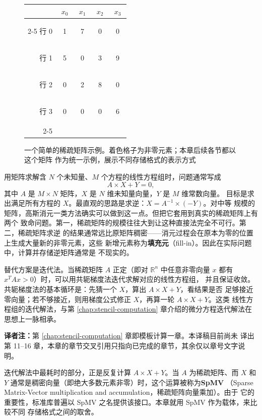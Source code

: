 \begin{figure}[htbp]
  \centering
  \small
  \begin{tabular}{r|cccc|}
    \multicolumn{1}{c}{} & \multicolumn{1}{c}{$x_0$} & \multicolumn{1}{c}{$x_1$}
      & \multicolumn{1}{c}{$x_2$} & \multicolumn{1}{c}{$x_3$}\\
    \cline{2-5}
    行 0 & \colorbox{blue!22}{\strut\ 1\ } & \colorbox{blue!22}{\strut\ 7\ } & \strut\ 0\ & \strut\ 0\ \\
    行 1 & \colorbox{blue!22}{\strut\ 5\ } & \strut\ 0\ & \colorbox{blue!22}{\strut\ 3\ } & \colorbox{blue!22}{\strut\ 9\ }\\
    行 2 & \strut\ 0\ & \colorbox{blue!22}{\strut\ 2\ } & \colorbox{blue!22}{\strut\ 8\ } & \strut\ 0\ \\
    行 3 & \strut\ 0\ & \strut\ 0\ & \strut\ 0\ & \colorbox{blue!22}{\strut\ 6\ }\\
    \cline{2-5}
  \end{tabular}
  \caption{一个简单的稀疏矩阵示例。着色格子为非零元素；本章后续各节都以这个矩阵
  作为统一示例，展示不同存储格式的表示方式}
  \label{fig:17-1}
\end{figure}

用矩阵求解含 $N$ 个未知量、$M$ 个方程的线性方程组时，问题通常写成
\[
  A\times X + Y = 0,
\]
其中 $A$ 是 $M\times N$ 矩阵，$X$ 是 $N$ 维未知量向量，$Y$ 是 $M$ 维常数向量。
目标是求出满足所有方程的 $X$。最直观的思路是求逆：$X = A^{-1}\times(-Y)$。对中等
规模的矩阵，高斯消元一类方法确实可以做到这一点。但把它套用到真实的稀疏矩阵上有两个
致命问题。第一，稀疏矩阵的规模往往大到让这种直接法完全不可行。第二，稀疏矩阵求逆
的结果通常远比原矩阵稠密——消元过程会在原本为零的位置上生成大量新的非零元素，这些
新增元素称为\textbf{填充元}（fill-in）。因此在实际问题中，计算并存储逆矩阵通常是
不现实的。

替代方案是迭代法。当稀疏矩阵 $A$ 正定（即对 $\mathbb{R}^n$ 中任意非零向量 $x$ 都有
$x^{T}Ax>0$）时，可以用共轭梯度法\cite{hestenes1952cg}迭代求解对应的线性方程组，
并且保证收敛。共轭梯度法的基本循环是：先猜一个 $X$，算出 $A\times X + Y$，看结果是否
足够接近零向量；若不够接近，则用梯度公式修正 $X$，再算一轮 $A\times X + Y$。这类
线性方程组的迭代解法，与第 \ref{chap:stencil-computation} 章介绍的微分方程迭代解法在思想上一脉相承。

\noindent\textbf{译者注：}第 \ref{chap:stencil-computation} 章即模板计算一章。本译稿目前尚未
译出第 11--16 章，本章的章节交叉引用只指向已完成的章节，其余仅以章号文字说明。

迭代解法中最耗时的部分，正是反复计算 $A\times X + Y$。当 $A$ 为稀疏矩阵、而 $X$ 和
$Y$ 通常是稠密向量（即绝大多数元素非零）时，这个运算被称为\textbf{SpMV}
（Sparse Matrix-Vector multiplication and accumulation，稀疏矩阵向量乘加）。由于
它的重要性，标准库普遍以 SpMV 之名提供该接口。本章就用 SpMV 作为载体，来比较不同
存储格式之间的取舍。

